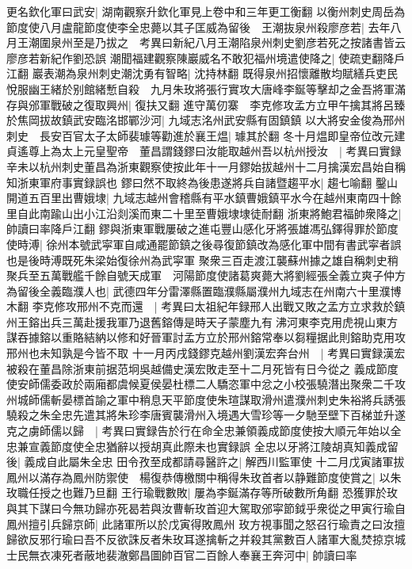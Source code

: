 更名欽化軍曰武安|{
	湖南觀察升欽化軍見上卷中和三年更工衡翻}
以衡州刺史周岳為節度使八月盧龍節度使李全忠薨以其子匡威為留後　王潮抜泉州殺廖彦若|{
	去年八月王潮圍泉州至是乃拔之　考異曰新紀八月王潮陷泉州刺史劉彦若死之按諸書皆云廖彦若新紀作劉恐誤}
潮聞福建觀察陳巖威名不敢犯福州境遣使降之|{
	使疏吏翻降戶江翻}
巖表潮為泉州刺史潮沈勇有智略|{
	沈持林翻}
既得泉州招懷離散均賦繕兵吏民悅服幽王緒於别館緒慙自殺　九月朱玫將張行實攻大唐峰李鋋等擊却之金吾將軍滿存與邠軍戰破之復取興州|{
	復扶又翻}
進守萬仞寨　李克修攻孟方立甲午擒其將呂臻於焦岡拔故鎮武安臨洺邯鄲沙河|{
	九域志洺州武安縣有固鎮鎮}
以大將安金俊為邢州刺史　長安百官太子太師裴璩等勸進於襄王煴|{
	璩其於翻}
冬十月煴即皇帝位改元建貞遙尊上為太上元皇聖帝　董昌謂錢鏐曰汝能取越州吾以杭州授汝　|{
	考異曰實録辛未以杭州刺史董昌為浙東觀察使按此年十一月鏐始拔越州十二月擒漢宏昌始自稱知浙東軍府事實録誤也}
鏐曰然不取終為後患遂將兵自諸暨趨平水|{
	趨七喻翻}
鑿山開道五百里出曹娥埭|{
	九域志越州會稽縣有平水鎮曹娥鎮平水今在越州東南四十餘里自此南踰山出小江沿剡溪而東二十里至曹娥埭埭徒耐翻}
浙東將鮑君福帥衆降之|{
	帥讀曰率降戶江翻}
鏐與浙東軍戰屢破之進屯豐山感化牙將張雄馮弘鐸得罪於節度使時溥|{
	徐州本號武寜軍自咸通罷節鎮之後尋復節鎮改為感化軍中間有書武寜者誤也是後時溥既死朱梁始復徐州為武寜軍}
聚衆三百走渡江襲蘇州據之雄自稱刺史稍聚兵至五萬戰艦千餘自號天成軍　河陽節度使諸葛爽薨大將劉經張全義立爽子仲方為留後全義臨濮人也|{
	武德四年分雷澤縣置臨濮縣屬濮州九域志在州南六十里濮博木翻}
李克修攻邢州不克而還　|{
	考異曰太祖紀年録邢人出戰又敗之孟方立求救於鎮州王鎔出兵三萬赴援我軍乃退舊鎔傳是時天子蒙塵九有沸河東李克用虎視山東方謀吞據鎔以重賂結納以修和好晉軍討孟方立於邢州鎔常奉以芻糧据此則鎔助克用攻邢州也未知孰是今皆不取}
十一月丙戌錢鏐克越州劉漢宏奔台州　|{
	考異曰實録漢宏被殺在董昌除浙東前据范坰吳越備史漢宏敗走至十二月死皆有日今從之}
義成節度使安師儒委政於兩廂都虞候夏侯晏杜標二人驕恣軍中忿之小校張驍潛出聚衆二千攻州城師儒斬晏標首諭之軍中稍息天平節度使朱瑄謀取滑州遣濮州刺史朱裕將兵誘張驍殺之朱全忠先遣其將朱珍李唐賓襲滑州入境遇大雪珍等一夕馳至壁下百梯並升遂克之虜師儒以歸　|{
	考異曰實録告於行在命全忠兼領義成節度使按大順元年始以全忠兼宣義節度使全忠猶辭以授胡真此際未也實録誤}
全忠以牙將江陵胡真知義成留後|{
	義成自此屬朱全忠}
田令孜至成都請尋醫許之|{
	解西川監軍使}
十二月戊寅諸軍拔鳳州以滿存為鳳州防禦使　楊復恭傳檄關中稱得朱玫首者以静難節度使賞之|{
	以朱玫職任授之也難乃旦翻}
王行瑜戰數敗|{
	屢為李鋋滿存等所破數所角翻}
恐獲罪於玫與其下謀曰今無功歸亦死曷若與汝曹斬玫首迎大駕取邠寜節鉞乎衆從之甲寅行瑜自鳳州擅引兵歸京師|{
	此諸軍所以於戊寅得敗鳳州}
玫方視事聞之怒召行瑜責之曰汝擅歸欲反邪行瑜曰吾不反欲誅反者朱玫耳遂擒斬之并殺其黨數百人諸軍大亂焚掠京城士民無衣凍死者蔽地裴澈鄭昌圖帥百官二百餘人奉襄王奔河中|{
	帥讀曰率}
